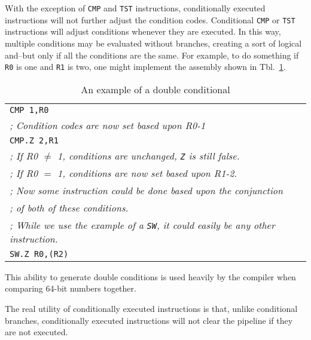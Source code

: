 \documentclass{gqtekspec}
\begin{document}
With the exception of \hbox{\tt CMP} and \hbox{\tt TST} instructions,
conditionally executed instructions will not further adjust the
condition codes.  Conditional \hbox{\tt CMP} or \hbox{\tt TST} instructions
will adjust conditions whenever they are executed.  In this way, multiple
conditions may be evaluated without branches, creating a sort of logical
and--but only if all the conditions are the same.  For example, to do
something if \hbox{\tt R0} is one and \hbox{\tt R1} is two, one might
implement the assembly shown in Tbl.~\ref{tbl:dbl-condition}.
\begin{table}\begin{center}
\begin{tabular}{l}
	{\tt CMP 1,R0} \\
	{\em ; Condition codes are now set based upon R0-1} \\
	{\tt CMP.Z 2,R1} \\
	{\em ; If R0 $\neq$ 1, conditions are unchanged, {\tt Z} is still false.} \\
	{\em ; If R0 $=$ 1, conditions are now set based upon R1-2.} \\
	{\em ; Now some instruction could be done based upon the conjunction} \\
	{\em ; of both of these conditions.} \\
	{\em ; While we use the example of a {\tt SW}, it could easily be any
		other instruction.} \\
	{\tt SW.Z R0,(R2)} \\
\end{tabular}
\caption{An example of a double conditional}\label{tbl:dbl-condition}
\end{center}\end{table}
This ability to generate double conditions is used heavily by the compiler
when comparing 64-bit numbers together.

The real utility of conditionally executed instructions is that, unlike
conditional branches, conditionally executed instructions will not clear the
pipeline if they are not executed.
\end{document}
